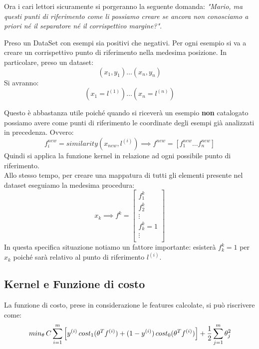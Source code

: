  Ora i cari lettori sicuramente si porgeranno la seguente domanda: \textit{"Mario, ma questi punti di riferimento come li possiamo creare se ancora non conosciamo a priori né il separatore né il corrispettivo margine?"}. 
\begin{definizione}
  Preso un DataSet con esempi sia positivi che negativi. Per ogni esempio si va a creare un corrispettivo punto di riferimento nella medesima posizione. In particolare, preso un dataset:
  \[{(x_1, y_1) \dots (x_n, y_n)}\]
  Si avranno:
  \[{(x_1 = l^{(1)}) \dots (x_n = l^{(n)})}\]
\end{definizione}
Questo è abbastanza utile poiché quando si riceverà un esempio \textbf{non} catalogato possiamo avere come punti di riferimento le coordinate degli esempi già analizzati in precedenza. Ovvero:
\[f^{new}_i = similarity(x_{new}, l^{(i)}) \implies f^{new} = [f^{new}_1 \dots f^{new}_n]\]
Quindi si applica la funzione kernel in relazione ad ogni possibile punto di riferimento. \\ Allo stesso tempo, per creare una mappatura di tutti gli elementi presente nel dataset eseguiamo la medesima procedura:
\[x_k \implies 
    f^k = \begin{bmatrix}
           f^k_{1} \\
           f^k_{2} \\
           \vdots \\
           f^k_{k} = 1 \\
           \vdots \\
         \end{bmatrix} \]
In questa specifica situazione notiamo un fattore importante: esisterà $f^k_{k} = 1$ per $x_k$ poiché sarà relativo al punto di riferimento $l^{(i)}$.
\subsection{Kernel e Funzione di costo}
La funzione di costo, prese in considerazione le features calcolate, si può riscrivere come:
\[min_\theta \, C \sum_{i=1}^m \left[ y^{(i)}\,cost_1(\theta^T f^{(i)}) + (1-y^{(i)})\,cost_0(\theta^T f^{(i)}) \right] + {1 \over 2 } \sum_{j=1}^m \theta_j^2\]

